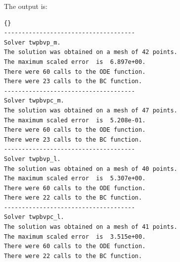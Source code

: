 \documentclass{article}
\begin{document}
The output is:

\begin{lstlisting}[fontadjust]{}
-------------------------------------
Solver twpbvp_m.
The solution was obtained on a mesh of 42 points.
The maximum scaled error  is  6.897e+00. 
There were 60 calls to the ODE function. 
There were 23 calls to the BC function. 
-------------------------------------
Solver twpbvpc_m.
The solution was obtained on a mesh of 47 points.
The maximum scaled error  is  5.208e-01. 
There were 60 calls to the ODE function. 
There were 23 calls to the BC function. 
-------------------------------------
Solver twpbvp_l.
The solution was obtained on a mesh of 40 points.
The maximum scaled error  is  5.307e+00. 
There were 60 calls to the ODE function. 
There were 22 calls to the BC function. 
-------------------------------------
Solver twpbvpc_l.
The solution was obtained on a mesh of 41 points.
The maximum scaled error  is  3.515e+00. 
There were 60 calls to the ODE function. 
There were 22 calls to the BC function. 
\end{lstlisting}
\end{document}
